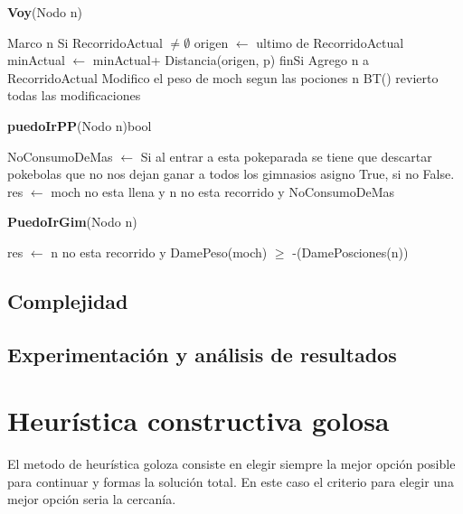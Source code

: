 \documentclass[spanish,12pt]{article}
\begin{document}
\begin{algorithm}[H]{\textbf{Voy}(Nodo n)}
	\begin{algorithmic}[1]
		\State Marco n
		\State Si RecorridoActual $ \not= \emptyset$
		\State \quad origen $\gets$ ultimo de RecorridoActual
		\State \quad minActual $\gets$ minActual+ Distancia(origen, p)
		\State finSi
		\State Agrego n a RecorridoActual
		\State Modifico el peso de moch segun las pociones n
		\State BT()
		\State revierto todas las modificaciones
	\end{algorithmic}
\end{algorithm}

\begin{algorithm}[H]{\textbf{puedoIrPP}(Nodo n){bool}}
	\begin{algorithmic}[1]
	\State NoConsumoDeMas $\gets$ Si al entrar a esta pokeparada se tiene que descartar pokebolas que no nos dejan ganar a todos los gimnasios asigno True, si no False.
	\State  res $\gets$  moch no esta llena y n no esta recorrido y NoConsumoDeMas
	\end{algorithmic}
\end{algorithm}

\begin{algorithm}[H]{\textbf{PuedoIrGim}(Nodo n)}
	\begin{algorithmic}[1]
		\state res $\gets$  n no esta recorrido y DamePeso(moch) $\geq$ -(DamePosciones(n))
	\end{algorithmic}
\end{algorithm}


\subsection{Complejidad}

\subsection{Experimentación y análisis de resultados}



\section{Heurística constructiva golosa}

El metodo de heurística goloza consiste en elegir siempre la mejor opción posible para continuar y formas la solución total. En este caso el criterio para elegir una mejor opción seria la cercanía.
\end{document}
